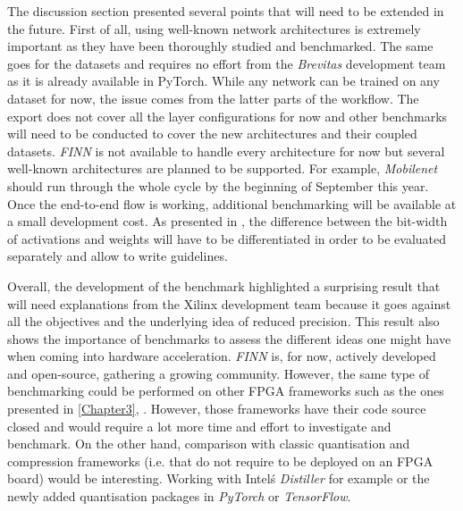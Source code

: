 The discussion section presented several points that will need to be extended in the future. First of all, using well-known network architectures is extremely important as they have been thoroughly studied and benchmarked. The same goes for the datasets and requires no effort from the \emph{Brevitas} development team as it is already available in PyTorch. While any network can be trained on any dataset for now, the issue comes from the latter parts of the workflow. The export does not cover all the layer configurations for now and other benchmarks will need to be conducted to cover the new architectures and their coupled datasets. \emph{FINN} is not available to handle every architecture for now but several well-known architectures are planned to be supported. For example, \emph{Mobilenet} should run through the whole cycle by the beginning of September this year. Once the end-to-end flow is working, additional benchmarking will be available at a small development cost. As presented in \cite{Bacchus2020}, the difference between the bit-width of activations and weights will have to be differentiated in order to be evaluated separately and allow to write guidelines.

Overall, the development of the benchmark highlighted a surprising result that will need explanations from the Xilinx development team because it goes against all the objectives and the underlying idea of reduced precision. This result also shows the importance of benchmarks to assess the different ideas one might have when coming into hardware acceleration. \emph{FINN} is, for now, actively developed and open-source, gathering a growing community. However, the same type of benchmarking could be performed on other FPGA frameworks such as the ones presented in \ref{Chapter3}, \cite{Andri2016, Zhao2016, Venieris2017, Ding2019, Jahanshahi2019}. However, those frameworks have their code source closed and would require a lot more time and effort to investigate and benchmark. On the other hand, comparison with classic quantisation and compression frameworks (i.e. that do not require to be deployed on an FPGA board) would be interesting. Working with Intel\'s \emph{Distiller} \cite{Nzmora2019} for example or the newly added quantisation packages in \emph{PyTorch} or \emph{TensorFlow}.
